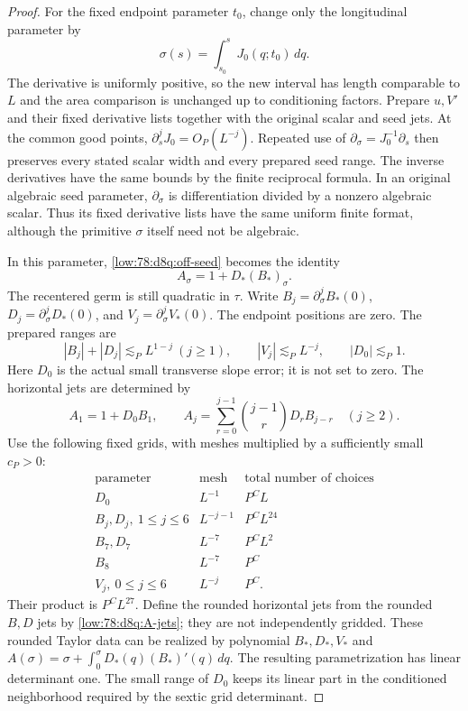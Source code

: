 \documentclass[11pt]{amsart}
\theoremstyle{definition}
\theoremstyle{remark}
\numberwithin{equation}{section}
\begin{document}
\begin{proof}
For the fixed endpoint parameter $t_0$, change only the longitudinal parameter by
\[
\sigma(s)=\int_{s_0}^sJ_0(q;t_0)\,dq.
\]
The derivative is uniformly positive, so the new interval has length comparable to $L$ and the area comparison is unchanged up to conditioning factors. Prepare $u,V'$ and their fixed derivative lists together with the original scalar and seed jets. At the common good points, $\partial_s^jJ_0=O_P(L^{-j})$. Repeated use of $\partial_\sigma=J_0^{-1}\partial_s$ then preserves every stated scalar width and every prepared seed range. The inverse derivatives have the same bounds by the finite reciprocal formula. In an original algebraic seed parameter, $\partial_\sigma$ is differentiation divided by a nonzero algebraic scalar. Thus its fixed derivative lists have the same uniform finite format, although the primitive $\sigma$ itself need not be algebraic.

In this parameter, \eqref{low:78:d8q:off-seed} becomes the identity
\begin{equation}\label{low:78:d8q:flux-identity}
A_\sigma=1+D_* (B_*)_\sigma.
\end{equation}
The recentered germ is still quadratic in $\tau$. Write $B_j=\partial_\sigma^jB_*(0)$, $D_j=\partial_\sigma^jD_*(0)$, and $V_j=\partial_\sigma^jV_*(0)$. The endpoint positions are zero. The prepared ranges are
\[
|B_j|+|D_j|\lesssim_PL^{1-j}\ (j\ge1),\qquad |V_j|\lesssim_PL^{-j},\qquad |D_0|\lesssim_P1.
\]
Here $D_0$ is the actual small transverse slope error; it is not set to zero. The horizontal jets are determined by
\begin{equation}\label{low:78:d8q:A-jets}
A_1=1+D_0B_1,\qquad A_j=\sum_{r=0}^{j-1}\binom{j-1}{r}D_r B_{j-r}\quad(j\ge2).
\end{equation}
Use the following fixed grids, with meshes multiplied by a sufficiently small $c_P>0$:
\[
\begin{array}{c|c|c}
\text{parameter}&\text{mesh}&\text{total number of choices}\\\hline
D_0&L^{-1}&P^CL\\
B_j,D_j,\ 1\le j\le6&L^{-j-1}&P^CL^{24}\\
B_7,D_7&L^{-7}&P^CL^2\\
B_8&L^{-7}&P^C\\
V_j,\ 0\le j\le6&L^{-j}&P^C.
\end{array}
\]
Their product is $P^CL^{27}$. Define the rounded horizontal jets from the rounded $B,D$ jets by \eqref{low:78:d8q:A-jets}; they are not independently gridded. These rounded Taylor data can be realized by polynomial $B_*,D_*,V_*$ and $A(\sigma)=\sigma+\int_0^\sigma D_*(q)(B_*)'(q)\,dq$. The resulting parametrization has linear determinant one. The small range of $D_0$ keeps its linear part in the conditioned neighborhood required by the sextic grid determinant.


\end{proof}
\end{document}
